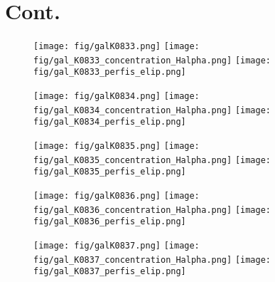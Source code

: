 \chapter{Cont.}
\label{cap02}




\begin{figure}[!ht]
\begin{center}
\setcaptionmargin{1cm}
\texttt{[image: fig/galK0833.png]}
\texttt{[image: fig/gal\_K0833\_concentration\_Halpha.png]}
\texttt{[image: fig/gal\_K0833\_perfis\_elip.png]}
\end{center}
\end{figure}


\begin{figure}[!ht]
\begin{center}
\setcaptionmargin{1cm}
\texttt{[image: fig/galK0834.png]}
\texttt{[image: fig/gal\_K0834\_concentration\_Halpha.png]}
\texttt{[image: fig/gal\_K0834\_perfis\_elip.png]}
\end{center}
\end{figure}


\begin{figure}[!ht]
\begin{center}
\setcaptionmargin{1cm}
\texttt{[image: fig/galK0835.png]}
\texttt{[image: fig/gal\_K0835\_concentration\_Halpha.png]}
\texttt{[image: fig/gal\_K0835\_perfis\_elip.png]}
\end{center}
\end{figure}


\begin{figure}[!ht]
\begin{center}
\setcaptionmargin{1cm}
\texttt{[image: fig/galK0836.png]}
\texttt{[image: fig/gal\_K0836\_concentration\_Halpha.png]}
\texttt{[image: fig/gal\_K0836\_perfis\_elip.png]}
\end{center}
\end{figure}


\begin{figure}[!ht]
\begin{center}
\setcaptionmargin{1cm}
\texttt{[image: fig/galK0837.png]}
\texttt{[image: fig/gal\_K0837\_concentration\_Halpha.png]}
\texttt{[image: fig/gal\_K0837\_perfis\_elip.png]}
\end{center}
\end{figure}


